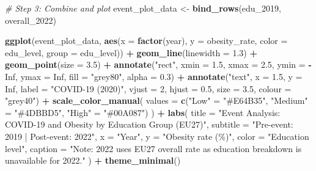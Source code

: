 \documentclass[
]{article}
\newenvironment{Shaded}{\begin{snugshade}}{\end{snugshade}}
\newcommand{\AttributeTok}[1]{\textcolor[rgb]{0.13,0.29,0.53}{#1}}
\newcommand{\CommentTok}[1]{\textcolor[rgb]{0.56,0.35,0.01}{\textit{#1}}}
\newcommand{\ConstantTok}[1]{\textcolor[rgb]{0.56,0.35,0.01}{#1}}
\newcommand{\DecValTok}[1]{\textcolor[rgb]{0.00,0.00,0.81}{#1}}
\newcommand{\FloatTok}[1]{\textcolor[rgb]{0.00,0.00,0.81}{#1}}
\newcommand{\FunctionTok}[1]{\textcolor[rgb]{0.13,0.29,0.53}{\textbf{#1}}}
\newcommand{\NormalTok}[1]{#1}
\newcommand{\OtherTok}[1]{\textcolor[rgb]{0.56,0.35,0.01}{#1}}
\newcommand{\SpecialCharTok}[1]{\textcolor[rgb]{0.81,0.36,0.00}{\textbf{#1}}}
\newcommand{\StringTok}[1]{\textcolor[rgb]{0.31,0.60,0.02}{#1}}
\begin{document}
\begin{Shaded}
\begin{Highlighting}[]
\CommentTok{\# Step 3: Combine and plot}
\NormalTok{event\_plot\_data }\OtherTok{\textless{}{-}} \FunctionTok{bind\_rows}\NormalTok{(edu\_2019, overall\_2022)}

\FunctionTok{ggplot}\NormalTok{(event\_plot\_data, }\FunctionTok{aes}\NormalTok{(}\AttributeTok{x =} \FunctionTok{factor}\NormalTok{(year), }\AttributeTok{y =}\NormalTok{ obesity\_rate,}
                             \AttributeTok{color =}\NormalTok{ edu\_level, }\AttributeTok{group =}\NormalTok{ edu\_level)) }\SpecialCharTok{+}
  \FunctionTok{geom\_line}\NormalTok{(}\AttributeTok{linewidth =} \FloatTok{1.3}\NormalTok{) }\SpecialCharTok{+}
  \FunctionTok{geom\_point}\NormalTok{(}\AttributeTok{size =} \FloatTok{3.5}\NormalTok{) }\SpecialCharTok{+}
  \FunctionTok{annotate}\NormalTok{(}\StringTok{"rect"}\NormalTok{, }\AttributeTok{xmin =} \FloatTok{1.5}\NormalTok{, }\AttributeTok{xmax =} \FloatTok{2.5}\NormalTok{,}
           \AttributeTok{ymin =} \SpecialCharTok{{-}}\ConstantTok{Inf}\NormalTok{, }\AttributeTok{ymax =} \ConstantTok{Inf}\NormalTok{, }\AttributeTok{fill =} \StringTok{"grey80"}\NormalTok{, }\AttributeTok{alpha =} \FloatTok{0.3}\NormalTok{) }\SpecialCharTok{+}
  \FunctionTok{annotate}\NormalTok{(}\StringTok{"text"}\NormalTok{, }\AttributeTok{x =} \FloatTok{1.5}\NormalTok{, }\AttributeTok{y =} \ConstantTok{Inf}\NormalTok{,}
           \AttributeTok{label =} \StringTok{"COVID{-}19 (2020)"}\NormalTok{, }\AttributeTok{vjust =} \DecValTok{2}\NormalTok{, }\AttributeTok{hjust =} \FloatTok{0.5}\NormalTok{,}
           \AttributeTok{size =} \FloatTok{3.5}\NormalTok{, }\AttributeTok{colour =} \StringTok{"grey40"}\NormalTok{) }\SpecialCharTok{+}
  \FunctionTok{scale\_color\_manual}\NormalTok{(}
    \AttributeTok{values =} \FunctionTok{c}\NormalTok{(}\StringTok{"Low"} \OtherTok{=} \StringTok{"\#E64B35"}\NormalTok{, }\StringTok{"Medium"} \OtherTok{=} \StringTok{"\#4DBBD5"}\NormalTok{, }\StringTok{"High"} \OtherTok{=} \StringTok{"\#00A087"}\NormalTok{)}
\NormalTok{  ) }\SpecialCharTok{+}
  \FunctionTok{labs}\NormalTok{(}
    \AttributeTok{title    =} \StringTok{"Event Analysis: COVID{-}19 and Obesity by Education Group (EU27)"}\NormalTok{,}
    \AttributeTok{subtitle =} \StringTok{"Pre{-}event: 2019  |  Post{-}event: 2022"}\NormalTok{,}
    \AttributeTok{x        =} \StringTok{"Year"}\NormalTok{,}
    \AttributeTok{y        =} \StringTok{"Obesity rate (\%)"}\NormalTok{,}
    \AttributeTok{color    =} \StringTok{"Education level"}\NormalTok{,}
    \AttributeTok{caption  =} \StringTok{"Note: 2022 uses EU27 overall rate as education breakdown is unavailable for 2022."}
\NormalTok{  ) }\SpecialCharTok{+}
  \FunctionTok{theme\_minimal}\NormalTok{()}
\end{Highlighting}
\end{Shaded}
\end{document}
